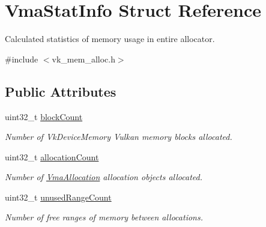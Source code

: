 \hypertarget{structVmaStatInfo}{}\section{Vma\+Stat\+Info Struct Reference}
\label{structVmaStatInfo}


Calculated statistics of memory usage in entire allocator.  




{\ttfamily \#include $<$vk\+\_\+mem\+\_\+alloc.\+h$>$}

\subsection*{Public Attributes}
\begin{DoxyCompactItemize}
\item 
\mbox{\label{structVmaStatInfo_abc4bb7cd611900778464c56e50c970a4}} 
uint32\+\_\+t \hyperlink{structVmaStatInfo_abc4bb7cd611900778464c56e50c970a4}{block\+Count}
\begin{DoxyCompactList}\small\item\em Number of {\ttfamily Vk\+Device\+Memory} Vulkan memory blocks allocated. \end{DoxyCompactList}\item 
\mbox{\label{structVmaStatInfo_a537741e4d5cdddc1c0ab95ec650afaff}} 
uint32\+\_\+t \hyperlink{structVmaStatInfo_a537741e4d5cdddc1c0ab95ec650afaff}{allocation\+Count}
\begin{DoxyCompactList}\small\item\em Number of \hyperlink{structVmaAllocation}{Vma\+Allocation} allocation objects allocated. \end{DoxyCompactList}\item 
\mbox{\label{structVmaStatInfo_ae06129c771bfebfd6468a7f4276502a9}} 
uint32\+\_\+t \hyperlink{structVmaStatInfo_ae06129c771bfebfd6468a7f4276502a9}{unused\+Range\+Count}
\begin{DoxyCompactList}\small\item\em Number of free ranges of memory between allocations. \end{DoxyCompactList}\item 
\mbox{\label{structVmaStatInfo_ab0c6c73837e5a70c749fbd4f6064895a}} 

\end{DoxyCompactItemize}
